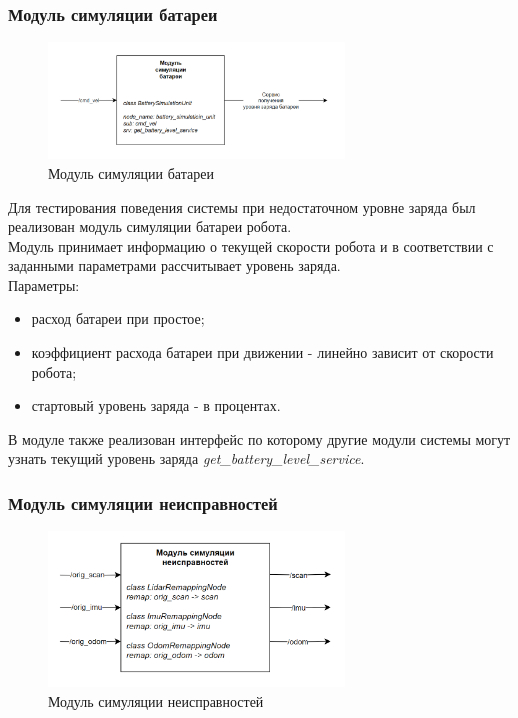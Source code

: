 \subsubsection{Модуль симуляции батареи}

\begin{figure}[h]
    \centering
    \includegraphics[width=0.7\textwidth]{images/chap_3/battery_sim_unit.png}
    \caption{Модуль симуляции батареи}
    \label{fig:battery_sim_unit}
\end{figure}

Для тестирования поведения системы при недостаточном уровне заряда был реализован модуль симуляции батареи робота. \\
Модуль принимает информацию о текущей скорости робота и в соответствии с заданными параметрами рассчитывает уровень заряда. \\
Параметры:
\begin{itemize}
    \item расход батареи при простое;
    \item коэффициент расхода батареи при движении - линейно зависит от скорости робота;
    \item стартовый уровень заряда - в процентах.
\end{itemize}

В модуле также реализован интерфейс по которому другие модули системы могут узнать текущий уровень заряда \textit{get\_battery\_level\_service}.

\subsubsection{Модуль симуляции неисправностей}

\begin{figure}[h]
    \centering
    \includegraphics[width=0.7\textwidth]{images/chap_3/failure_sim_unit.png}
    \caption{Модуль симуляции неисправностей}
    \label{fig:failure_sim_unit}
\end{figure}

